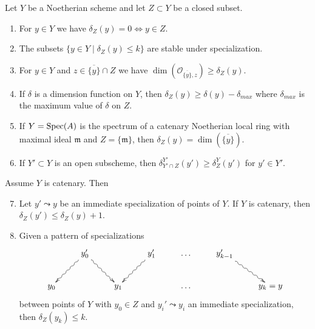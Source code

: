 \begin{lemma}
\label{lemma-discussion}
Let $Y$ be a Noetherian scheme and let $Z \subset Y$ be a closed subset.
\begin{enumerate}
\item For $y \in Y$ we have $\delta_Z(y) = 0 \Leftrightarrow y \in Z$.
\item The subsets $\{y \in Y \mid \delta_Z(y) \leq k\}$ are
stable under specialization.
\item For $y \in Y$ and $z \in \overline{\{y\}} \cap Z$ we have
$\dim(\mathcal{O}_{\overline{\{y\}}, z}) \geq \delta_Z(y)$.
\item If $\delta$ is a dimension function on $Y$, then
$\delta_Z(y) \geq \delta(y) - \delta_{max}$ where $\delta_{max}$
is the maximum value of $\delta$ on $Z$.
\item If $Y = \mathop{\mathrm{Spec}}(A)$ is the spectrum of a catenary Noetherian local ring
with maximal ideal $\mathfrak m$ and $Z = \{\mathfrak m\}$, then
$\delta_Z(y) = \dim(\overline{\{y\}})$.
\item If $Y' \subset Y$ is an open subscheme, then
$\delta^{Y'}_{Y' \cap Z}(y') \geq \delta^Y_Z(y')$ for $y' \in Y'$.
\end{enumerate}
Assume $Y$ is catenary. Then
\begin{enumerate}
\setcounter{enumi}{6}
\item Let $y' \leadsto y$ be an immediate specialization of points of $Y$.
If $Y$ is catenary, then $\delta_Z(y') \leq \delta_Z(y) + 1$.
\item Given a pattern of specializations
$$
\xymatrix{
& y'_0 \ar@{~>}[ld] \ar@{~>}[rd] &
& y'_1 \ar@{~>}[ld] & \ldots
& y'_{k - 1} \ar@{~>}[rd] &
\\
y_0 & &
y_1 & &
\ldots & &
y_k = y
}
$$
between points of $Y$ with $y_0 \in Z$ and $y_i' \leadsto y_i$
an immediate specialization, then $\delta_Z(y_k) \leq k$.
\end{enumerate}
\end{lemma}

